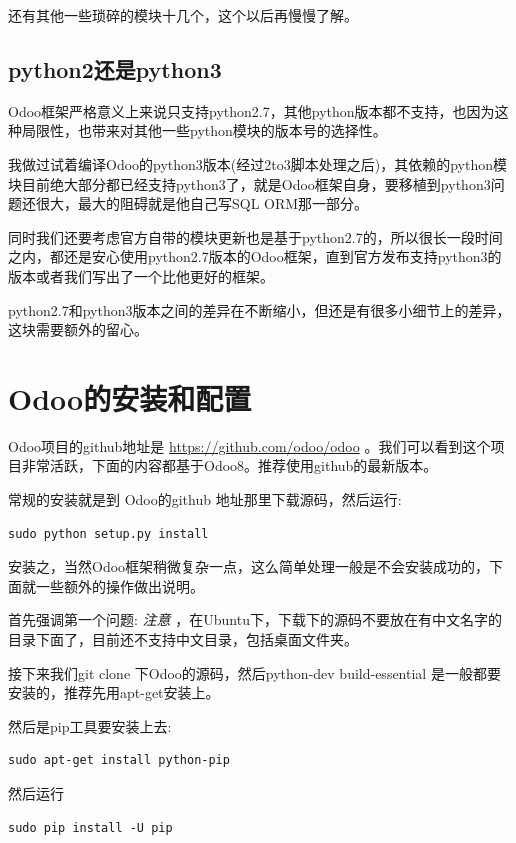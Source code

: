 \documentclass[11pt,a4paper]{sphinxmanual}
\begin{document}
还有其他一些琐碎的模块十几个，这个以后再慢慢了解。​


\section{python2还是python3}
\label{sec-2-2}
Odoo框架严格意义上来说只支持python2.7，其他python版本都不支持，也因为这种局限性，也带来对其他一些python模块的版本号的选择性。​

我做过试着编译Odoo的python3版本(经过2to3脚本处理之后)，其依赖的python模块目前绝大部分都已经支持python3了，就是Odoo框架自身，要移植到python3问题还很大，最大的阻碍就是他自己写SQL ORM那一部分。​

同时我们还要考虑官方自带的模块更新也是基于python2.7的，所以很长一段时间之内，都还是安心使用python2.7版本的Odoo框架，直到官方发布支持python3的版本或者我们写出了一个比他更好的框架。​

python2.7和python3版本之间的差异在不断缩小，但还是有很多小细节上的差异，这块需要额外的留心。​


\chapter{Odoo的安装和配置}
\label{sec-3}
Odoo项目的github地址是 \href{https://github.com/odoo/odoo}{\url{https://github.com/odoo/odoo}} 。我们可以看到这个项目非常活跃，下面的内容都基于Odoo8。推荐使用github的最新版本。

常规的安装就是到 Odoo的github 地址那里下载源码，然后运行: ​

\begin{verbatim}
sudo python setup.py install ​
\end{verbatim}


安装之，当然Odoo框架稍微复杂一点，这么简单处理一般是不会安装成功的，下面就一些额外的操作做出说明。​

首先强调第一个问题: \emph{注意} ，在Ubuntu下，下载下的源码不要放在有中文名字的目录下面了，目前还不支持中文目录，包括桌面文件夹。

接下来我们git clone 下Odoo的源码，然后python-dev  build-essential 是一般都要安装的，推荐先用apt-get安装上。

然后是pip工具要安装上去: 

\begin{verbatim}
sudo apt-get install python-pip
\end{verbatim}

然后运行
\begin{verbatim}
sudo pip install -U pip
\end{verbatim}
\end{document}
